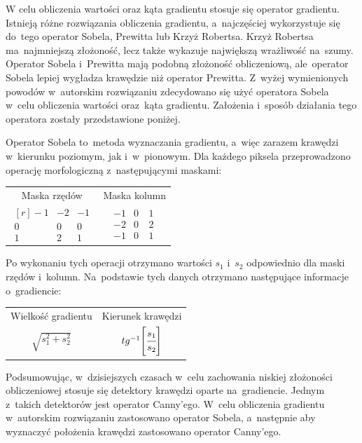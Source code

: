 \documentclass[a4paper,11pt,twoside,openright]{report}
\theoremstyle{definition}
\begin{document}
W celu obliczenia wartości oraz kąta gradientu stosuje się operator gradientu.
Istnieją różne rozwiązania obliczenia gradientu, a~najczęściej wykorzystuje się
do~tego operator Sobela, Prewitta lub Krzyż Robertsa. Krzyż Robertsa ma~najmniejszą złożoność,
lecz także wykazuje największą wrażliwość na~szumy. Operator Sobela i~Prewitta
mają podobną złożoność obliczeniową, ale~operator Sobela lepiej wygładza
krawędzie niż operator Prewitta. Z~wyżej wymienionych powodów w~autorskim rozwiązaniu
zdecydowano się użyć operatora Sobela w~celu obliczenia wartości oraz~kąta gradientu.
Założenia i~sposób działania tego operatora zostały przedstawione poniżej.

Operator Sobela \cite{Sobel} to~metoda wyznaczania gradientu, a~więc zarazem
krawędzi w~kierunku poziomym, jak i~w~pionowym. Dla każdego piksela
przeprowadzono operację morfologiczną z~następującymi maskami:

\begin{table}[h!]
\centering
\setlength{\tabcolsep}{40pt}
\begin{tabular} { c c }
  Maska rzędów & Maska kolumn \\
$
\begin{matrix*}[r]
-1 & -2 & -1 \\
0 & 0~& 0~\\
1 & 2~& 1
\end{matrix*}$
&
$\begin{matrix}
-1 & 0~& 1~\\
-2 & 0~& 2~\\
-1 & 0~& 1
\end{matrix}$
\end{tabular}
\end{table}

Po wykonaniu tych operacji otrzymano wartości $s_1$ i~$s_2$ odpowiednio dla maski
rzędów i~kolumn. Na~podstawie tych danych otrzymano następujące informacje o~gradiencie:
\begin{table}[h!]
\centering
\setlength{\tabcolsep}{30pt}
\begin{tabular} { c c }
  Wielkość gradientu & Kierunek krawędzi \\
$\sqrt{s_1^2 + s_2^2}$ & $tg^{-1} \Bigg[ {\cfrac{s_1}{s_2}} \Bigg]$
\end{tabular}
\end{table}

Podsumowując, w~dzisiejszych czasach w~celu zachowania niskiej złożoności obliczeniowej stosuje się
detektory krawędzi oparte na~gradiencie. Jednym z~takich detektorów jest operator Canny'ego. W~celu obliczenia
gradientu w~autorskim rozwiązaniu zastosowano operator Sobela, a~następnie aby wyznaczyć
położenia krawędzi zastosowano operator Canny'ego.
\end{document}
